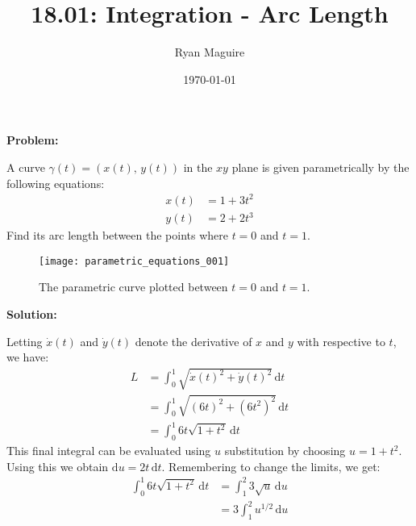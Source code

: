 \documentclass{article}
\title{18.01: Integration - Arc Length}
\author{Ryan Maguire}
\date{\today}
\newif\ifsolution
\begin{document}
    \maketitle
    \textbf{Problem:}
    \par\hfill\par
    A curve $\gamma(t)=\left(x(t),\,y(t)\right)$
    in the $xy$ plane is given parametrically by the following equations:
    \begin{subequations}
        \begin{align}
            x(t)&=1+3t^{2}\\
            y(t)&=2+2t^{3}
        \end{align}
    \end{subequations}
    Find its arc length between the points where $t=0$ and $t=1$.
    \begin{figure}[H]
        \centering
        \texttt{[image: parametric\_equations\_001]}
        \caption{The parametric curve plotted between $t=0$ and $t=1$.}
    \end{figure}
    \ifsolution
        \newpage
        \color{blue}
        \textbf{Solution:}
        \par\hfill\par
        Letting $\dot{x}(t)$ and $\dot{y}(t)$ denote the derivative of
        $x$ and $y$ with respective to $t$,
        we have:
        \begin{subequations}
            \begin{align}
                L&=\int_{0}^{1}\sqrt{\dot{x}(t)^{2}+\dot{y}(t)^{2}}
                    \,\textrm{d}t\\
                &=\int_{0}^{1}\sqrt{(6t)^2+(6t^2)^2}\,\textrm{d}t\\
                &=\int_{0}^{1}6t\sqrt{1+t^{2}}\,\textrm{d}t
            \end{align}
        \end{subequations}
        This final integral can be evaluated using $u$ substitution
        by choosing $u=1+t^{2}$. Using this we obtain
        $\textrm{d}u=2t\,\textrm{d}t$. Remembering to change the limits,
        we get:
        \begin{subequations}
            \begin{align}
                \int_{0}^{1}6t\sqrt{1+t^{2}}\,\textrm{d}t
                &=\int_{1}^{2}3\sqrt{u}\,\textrm{d}u\\
                &=3\int_{1}^{2}u^{1/2}\,\textrm{d}u
            \end{align}
        \end{subequations}
\end{document}
